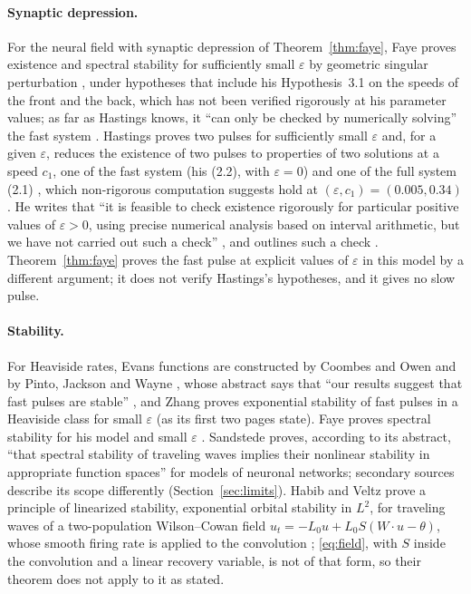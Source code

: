 \documentclass[11pt]{article}
\theoremstyle{definition}
\newcommand{\eps}{\varepsilon}
\begin{document}
\paragraph{Synaptic depression.} For the neural field with synaptic depression of Theorem~\ref{thm:faye}, Faye proves existence and spectral stability for sufficiently small $\eps$ by geometric singular perturbation \cite[Theorems~3.1 and~4.1]{faye2013}, under hypotheses that include his Hypothesis~3.1 on the speeds of the front and the back, which has not been verified rigorously at his parameter values; as far as Hastings knows, it ``can only be checked by numerically solving'' the fast system \cite[Remark~3, p.~6]{hastings2017}. Hastings proves two pulses for sufficiently small $\eps$ \cite[Theorem~1]{hastings2017} and, for a given $\eps$, reduces the existence of two pulses to properties of two solutions at a speed $c_1$, one of the fast system (his (2.2), with $\eps = 0$) and one of the full system (2.1) \cite[Theorem~2, p.~5, and Remark~2, p.~6]{hastings2017}, which non-rigorous computation suggests hold at $(\eps, c_1) = (0.005, 0.34)$ \cite[p.~6, footnote~4]{hastings2017}. He writes that ``it is feasible to check existence rigorously for particular positive values of $\eps > 0$, using precise numerical analysis based on interval arithmetic, but we have not carried out such a check'' \cite[Sect.~1, p.~2]{hastings2017}, and outlines such a check \cite[Sect.~4.5]{hastings2017}. Theorem~\ref{thm:faye} proves the fast pulse at explicit values of $\eps$ in this model by a different argument; it does not verify Hastings's hypotheses, and it gives no slow pulse.

\paragraph{Stability.} For Heaviside rates, Evans functions are constructed by Coombes and Owen \cite{co2004} and by Pinto, Jackson and Wayne \cite{pjw2005}, whose abstract says that ``our results suggest that fast pulses are stable'' \cite[p.~954]{pjw2005}, and Zhang \cite{zhang2004acta} proves exponential stability of fast pulses in a Heaviside class for small $\eps$ (as its first two pages state). Faye proves spectral stability for his model and small $\eps$ \cite[Theorem~4.1]{faye2013}. Sandstede \cite{sandstede2007} proves, according to its abstract, ``that spectral stability of traveling waves implies their nonlinear stability in appropriate function spaces'' \cite[p.~2693]{sandstede2007} for models of neuronal networks; secondary sources describe its scope differently (Section~\ref{sec:limits}). Habib and Veltz \cite[Theorem~1, p.~7]{hv2024} prove a principle of linearized stability, exponential orbital stability in $L^2$, for traveling waves of a two-population Wilson--Cowan field $u_t = -L_0u + L_0S(W \cdot u - \theta)$, whose smooth firing rate is applied to the convolution \cite[eqs.~(1)--(2), p.~3]{hv2024}; \eqref{eq:field}, with $S$ inside the convolution and a linear recovery variable, is not of that form, so their theorem does not apply to it as stated.
\end{document}
